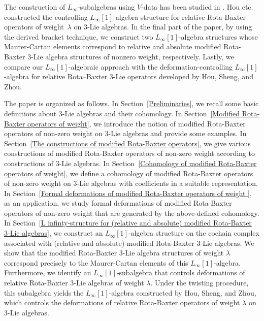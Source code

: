 \documentclass[12pt]{amsart}
\theoremstyle{definition}
\begin{document}
The construction of $L_\infty$-subalgebras using $V$-data has been studied in \cite{DM22, FZ15, LQYZ24}. Hou etc.\cite{HSZ23} constructed the controlling $L_\infty[1]$-algebra structure for relative Rota-Baxter operators of weight~$\lambda$ on $3$-Lie algebras. In the final part of the paper, by using the derived bracket technique,  we construct two \(L_\infty[1]\)-algebra structures whose Maurer-Cartan elements correspond to relative and absolute modified Rota-Baxter \(3\)-Lie algebra structures of nonzero weight, respectively. Lastly, we compare our \(L_\infty[1]\)-algebraic approach with the deformation-controlling \(L_\infty[1]\)-algebra for relative Rota--Baxter \(3\)-Lie operators developed by Hou, Sheng, and Zhou.



The paper is organized as follows. In Section~\ref{Preliminaries}, we recall some basic definitions about  $3$-Lie algebras and their cohomology. In Section~\ref{Modified Rota-Baxter operators of weight}, we introduce the notion of  modified Rota-Baxter
operators of non-zero weight on $3$-Lie algebras  and provide some examples. In Section~\ref{The constructions of modified Rota-Baxter operators},  we give various constructions of modified Rota-Baxter
operators of non-zero weight  according to constructions of $3$-Lie algebras.  In Section~\ref{Cohomology of modified Rota-Baxter operators of weight},   we define a cohomology of  modified Rota-Baxter
operators of non-zero weight  on $3$-Lie algebras with coefficients in a suitable representation. In Section~\ref{Formal deformations  of modified Rota-Baxter operators of weight },  as an application, we study formal deformations of modified Rota-Baxter
operators of non-zero weight  that are generated by the above-defined cohomology. In Section~\ref{L infinty-structure for (relative and absolute) modified Rota-Baxter 3-Lie algebras}, we construct an \( L_\infty[1] \)-algebra structure on the cochain complex associated with (relative and absolute) modified Rota-Baxter \( 3 \)-Lie algebras. We show that the modified Rota-Baxter \( 3 \)-Lie algebra structures of weight $\lambda$ correspond precisely to the Maurer-Cartan elements of this \( L_\infty[1] \)-algebra.  Furthermore, we identify an \( L_\infty[1] \)-subalgebra that controls deformations of relative Rota-Baxter \( 3 \)-Lie algebras of weight \( \lambda \). Under the twisting procedure, this subalgebra yields the \( L_\infty[1] \)-algebra constructed by Hou, Sheng, and Zhou, which controls the deformations of relative Rota-Baxter operators of weight \( \lambda \) on \( 3 \)-Lie algebras.
\end{document}
